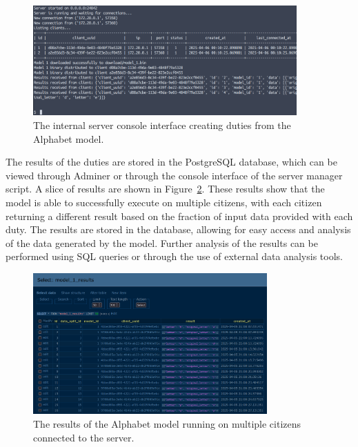 \documentclass[11pt]{article}
\begin{document}
\begin{figure}[h]
    \centering
    \includegraphics[width=0.9\textwidth]{./figures/internal_server.png}
    \caption{\small The internal server console interface creating duties from the Alphabet model.}\label{fig:internal_server}
\end{figure}

The results of the duties are stored in the PostgreSQL database, which can be viewed through Adminer or through the console interface of the server manager script. A slice of results are shown in Figure~\ref{fig:alphabet_1}. These results show that the model is able to successfully execute on multiple citizens, with each citizen returning a different result based on the fraction of input data provided with each duty. The results are stored in the database, allowing for easy access and analysis of the data generated by the model. Further analysis of the results can be performed using SQL queries or through the use of external data analysis tools.

\begin{figure}[h]
    \centering
    \includegraphics[width=0.8\textwidth]{./figures/alphabet.png}
    \caption{\small The results of the Alphabet model running on multiple citizens connected to the server.}\label{fig:alphabet_1}
\end{figure}

\newpage
\end{document}
